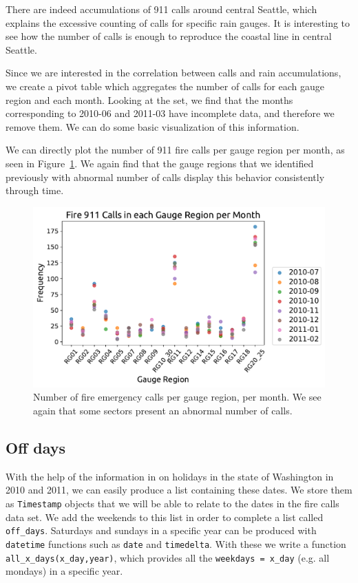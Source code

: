 \documentclass[12pt,a4paper]{article}
\begin{document}
There are indeed accumulations of 911 calls around central Seattle, which explains the excessive counting of calls for specific rain gauges. It is interesting to see how the number of calls is enough to reproduce the coastal line in central Seattle.

Since we are interested in the correlation between calls and rain accumulations, we create a pivot table which aggregates the number of calls for each gauge region and each month. Looking at the set, we find that the months corresponding to 2010-06 and 2011-03 have incomplete data, and therefore we remove them. We can do some basic visualization of this information.

We can directly plot the number of 911 fire calls per gauge region per month, as seen in Figure~\ref{CallsGaugeMonth}. We again find that the gauge regions that we identified previously with abnormal number of calls display this behavior consistently through time.

\begin{figure}[ht!]
\centering
\includegraphics[scale=0.65]{figs/CallsGaugeMonth.pdf}
\caption{Number of fire emergency calls per gauge region, per month. We see again that some sectors present an abnormal number of calls.}
\label{CallsGaugeMonth}
\end{figure}

\subsection{Off days}

With the help of the information in \cite{OfficeHolidays2010,OfficeHolidays2011} on holidays in the state of Washington in 2010 and 2011, we can easily produce a list containing these dates. We store them as \verb|Timestamp| objects that we will be able to relate to the dates in the fire calls data set. We add the weekends to this list in order to complete a list called \verb|off_days|. Saturdays and sundays in a specific year can be produced with \verb|datetime| functions such as \verb|date| and \verb|timedelta|. With these we write a function \verb|all_x_days(x_day,year)|, which provides all the \verb|weekdays = x_day| (e.g. all mondays) in a specific year.
\end{document}
